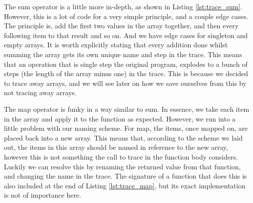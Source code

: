         The sum operator is a little more in-depth, as shown in Listing \ref{lst:trace_sum}.
        However, this is a lot of code for a very simple principle, and a couple edge cases.
        The principle is, add the first two values in the array together, and then every following item to that result and so on.
        And we have edge cases for singleton and empty arrays.
        It is worth explicitly stating that every addition done whilst summing the array gets its own unique name and step in the trace.
        This means that an operation that is single step the original program, explodes to a bunch of steps (the length of the array minus one) in the trace.
        This is because we decided to trace away arrays, and we will see later on how we save ourselves from this by not tracing away arrays.

        The map operator is funky in a way similar to sum.
        In essence, we take each item in the array and apply it to the function as expected.
        However, we run into a little problem with our naming scheme.
        For map, the items, once mapped on, are placed back into a new array.
        This means that, according to the scheme we laid out, the items in this array should be named in reference to the new array, however this is not something the call to trace in the function body considers.
        Luckily we can resolve this by renaming the returned value from that function, and changing the name in the trace.
        The signature of a function that does this is also included at the end of Listing \ref{lst:trace_map}, but its exact implementation is not of importance here.

